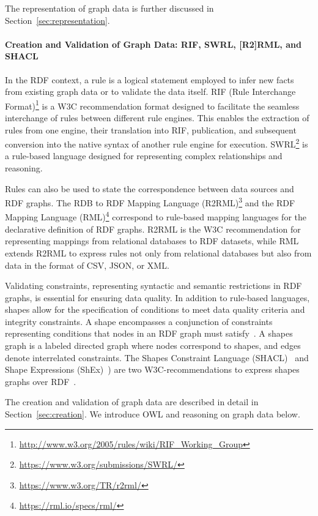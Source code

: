 \documentclass[a4paper,USenglish]{tgdk-v2021}
\newcommand{\myurl}[1]{\footnote{\url{#1}}}
\begin{document}
The representation of graph data is further discussed in Section~\ref{sec:representation}.

\paragraph*{Creation and Validation of Graph Data: RIF, SWRL, [R2]RML, and SHACL}

In the RDF context, a rule is a logical statement employed to infer new facts from existing graph data or to validate the data itself.
RIF (Rule Interchange Format)\myurl{http://www.w3.org/2005/rules/wiki/RIF_Working_Group} is a W3C recommendation format designed to facilitate the seamless interchange of rules between different rule engines.
This enables the extraction of rules from one engine, their translation into RIF, publication, and subsequent conversion into the native syntax of another rule engine for execution.
SWRL\myurl{https://www.w3.org/submissions/SWRL/} is a rule-based language designed for representing complex relationships 
and reasoning.

Rules can also be used to state the correspondence between data sources and RDF graphs. 
The RDB to RDF Mapping Language (R2RML)\myurl{https://www.w3.org/TR/r2rml/} and the RDF Mapping Language (RML)\myurl{https://rml.io/specs/rml/} correspond to rule-based mapping languages for the declarative definition of RDF graphs. R2RML is the W3C recommendation for representing mappings from relational databases to RDF datasets, while RML extends R2RML to express rules not only from relational databases but also from data in the format of CSV, JSON, or XML.

Validating constraints, representing syntactic and semantic restrictions in RDF graphs, is essential for ensuring data quality.
In addition to rule-based languages, shapes allow for the specification of conditions to meet data quality criteria and integrity constraints.
A shape encompasses a conjunction of constraints representing conditions that nodes in an RDF graph must satisfy~\cite{DBLP:series/synthesis/2021Hogan}. 
A shapes graph is a labeled directed graph where nodes correspond to shapes, and edges denote interrelated constraints. 
The Shapes Constraint Language (SHACL)~\cite{SHACL} and Shape Expressions (ShEx)~\cite{SHEX}) are two W3C-recommendations  to express shapes graphs over RDF~\cite{DBLP:conf/www/RabbaniLH22}.

The creation and validation of graph data are described in detail in Section~\ref{sec:creation}.
We introduce OWL and reasoning on graph data below.
 
\end{document}
